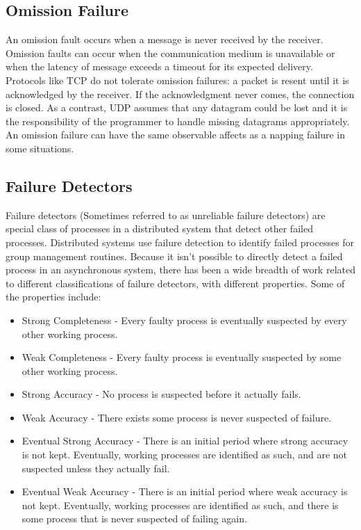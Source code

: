 \subsection{Omission Failure}

An omission fault\cite{OMISSIONFAILURES} occurs when a message is never received by the receiver.
Omission faults can occur when the communication medium is unavailable or when the latency of message exceeds a timeout for its expected delivery.
Protocols like TCP do not tolerate omission failures: a packet is resent until it is acknowledged by the receiver.
If the acknowledgment never comes, the connection is closed.
As a contrast, UDP assumes that any datagram could be lost and it is the responsibility of the programmer to handle missing datagrams appropriately.
An omission failure can have the same observable affects as a napping failure in some situations. \cite{DISTRIBUTED}


\subsection{Failure Detectors}

Failure detectors \cite{FAILUREDETECTORS} (Sometimes referred to as unreliable failure detectors) are special class of processes in a distributed system that detect other failed processes. Distributed systems use failure detection to identify failed processes for group management routines. Because it isn't possible to directly detect a failed process in an asynchronous system, there has been a wide breadth of work related to different classifications of failure detectors, with different properties. Some of the properties include\cite{FAILUREDETECTORS}:

\begin{itemize}
    \item Strong Completeness - Every faulty process is eventually suspected by
        every other working process.
    \item Weak Completeness - Every faulty process is eventually suspected by 
        some other working process.
    \item Strong Accuracy - No process is suspected before it actually fails.
    \item Weak Accuracy - There exists some process is never suspected of failure.
    \item Eventual Strong Accuracy - There is an initial period where strong
        accuracy is not kept. Eventually, working processes are identified
        as such, and are not suspected unless they actually fail.
    \item Eventual Weak Accuracy - There is an initial period where weak
        accuracy is not kept. Eventually, working processes are identified
        as such, and there is some process that is never suspected of failing
        again.
\end{itemize} 


